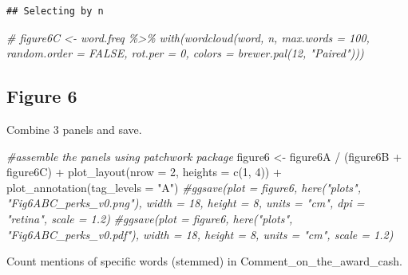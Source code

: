 \documentclass[
]{article}
\newenvironment{Shaded}{\begin{snugshade}}{\end{snugshade}}
\newcommand{\AttributeTok}[1]{\textcolor[rgb]{0.77,0.63,0.00}{#1}}
\newcommand{\CommentTok}[1]{\textcolor[rgb]{0.56,0.35,0.01}{\textit{#1}}}
\newcommand{\DecValTok}[1]{\textcolor[rgb]{0.00,0.00,0.81}{#1}}
\newcommand{\FunctionTok}[1]{\textcolor[rgb]{0.00,0.00,0.00}{#1}}
\newcommand{\NormalTok}[1]{#1}
\newcommand{\OtherTok}[1]{\textcolor[rgb]{0.56,0.35,0.01}{#1}}
\newcommand{\SpecialCharTok}[1]{\textcolor[rgb]{0.00,0.00,0.00}{#1}}
\newcommand{\StringTok}[1]{\textcolor[rgb]{0.31,0.60,0.02}{#1}}
\begin{document}
\begin{verbatim}
## Selecting by n
\end{verbatim}

\begin{Shaded}
\begin{Highlighting}[]
\CommentTok{\# figure6C \textless{}{-} word.freq \%\textgreater{}\% with(wordcloud(word, n, max.words = 100, random.order = FALSE, rot.per = 0, colors = brewer.pal(12, "Paired")))}
\end{Highlighting}
\end{Shaded}

\hypertarget{figure-6}{%
\subsection{Figure 6}\label{figure-6}}

Combine 3 panels and save.

\begin{Shaded}
\begin{Highlighting}[]
\CommentTok{\#assemble the panels using patchwork package}
\NormalTok{figure6 }\OtherTok{\textless{}{-}}\NormalTok{ figure6A }\SpecialCharTok{/}\NormalTok{ (figure6B }\SpecialCharTok{+}\NormalTok{ figure6C) }\SpecialCharTok{+}
  \FunctionTok{plot\_layout}\NormalTok{(}\AttributeTok{nrow =} \DecValTok{2}\NormalTok{, }\AttributeTok{heights =} \FunctionTok{c}\NormalTok{(}\DecValTok{1}\NormalTok{, }\DecValTok{4}\NormalTok{)) }\SpecialCharTok{+}
  \FunctionTok{plot\_annotation}\NormalTok{(}\AttributeTok{tag\_levels =} \StringTok{"A"}\NormalTok{)}
\CommentTok{\#ggsave(plot = figure6, here("plots", "Fig6ABC\_perks\_v0.png"), width = 18, height = 8, units = "cm", dpi = "retina", scale = 1.2)}
\CommentTok{\#ggsave(plot = figure6, here("plots", "Fig6ABC\_perks\_v0.pdf"), width = 18, height = 8, units = "cm", scale = 1.2)}
\end{Highlighting}
\end{Shaded}

Count mentions of specific words (stemmed) in
Comment\_on\_the\_award\_cash.
\end{document}
